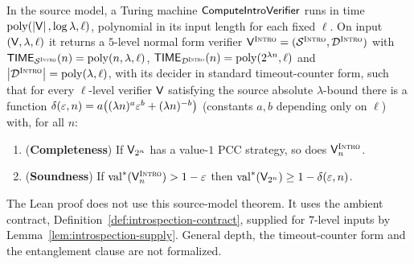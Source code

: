 \begin{theorem}[Introspection]
\label{thm:introspection}
In the source model, a Turing machine $\mathsf{ComputeIntroVerifier}$ runs in time
$\mathrm{poly}(\left\vert {\mathsf{V}} \right\vert,\log\lambda,\ell)$, polynomial in its input length for each
fixed $\ell$. On input $(\mathsf{V}, \lambda, \ell)$ it returns a $5$-level normal form verifier $\mathsf{V}^{\textsc{Intro}} =
(\mathcal{S}^{\textsc{Intro}}, \mathcal{D}^{\textsc{Intro}})$ with
$\mathsf{TIME}_{\mathcal{S}^{\textsc{Intro}}}(n) = \mathrm{poly}(n, \lambda, \ell)$,
$\mathsf{TIME}_{\mathcal{D}^{\textsc{Intro}}}(n) = \mathrm{poly}(2^{\lambda n}, \ell)$ and $\left\vert {\mathcal{D}^{\textsc{Intro}}} \right\vert = \mathrm{poly}(\lambda,
\ell)$, with its decider in standard timeout-counter form, such that for every
$\ell$-level verifier $\mathsf{V}$ satisfying the source absolute $\lambda$-bound there
is a function $\delta(\varepsilon, n) = a\bigl( (\lambda n)^a \varepsilon^b + (\lambda n)^{-b}
\bigr)$ (constants $a, b$ depending only on $\ell$) with, for all $n$:
\begin{enumerate}
\item (\textbf{Completeness}) If $\mathsf{V}_{2^n}$ has a value-$1$ PCC strategy, so
  does $\mathsf{V}^{\textsc{Intro}}_n$.
\item (\textbf{Soundness}) If $\mathrm{val}^*(\mathsf{V}^{\textsc{Intro}}_n) > 1 - \varepsilon$ then
  $\mathrm{val}^*(\mathsf{V}_{2^n}) \geq 1 - \delta(\varepsilon, n)$.
\end{enumerate}
The Lean proof does not use this source-model theorem. It uses the ambient contract,
Definition~\ref{def:introspection-contract}, supplied for $7$-level inputs by
Lemma~\ref{lem:introspection-supply}. General depth, the timeout-counter form and the
entanglement clause are not formalized.
\end{theorem}

